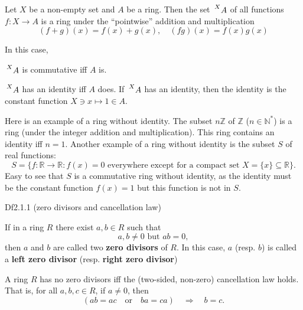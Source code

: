 \documentclass{article}
\begin{document}
\begin{Rmk_continued}{}
\begin{compactenum}
        \item \textcolor{Th}{Let $X$ be a non-empty set and $A$ be a ring. Then the set $\sideset{^X}{} {\mathop{A}}$ of all functions $f: X \to A$ is a ring under the ``pointwise'' addition and multiplication
        $$ (f + g)(x) = f(x) + g(x), \quad (fg)(x) = f(x)g(x) $$}
        \textcolor{Th}{In this case,
        \begin{compactenum}
            \item $\sideset{^X}{} {\mathop{A}}$ is commutative iff $A$ is.
            \item $\sideset{^X}{} {\mathop{A}}$ has an identity iff $A$ does. If $\sideset{^X}{} {\mathop{A}}$ has an identity, then the identity is the constant function $ X\ni x\mapsto 1 \in A $.
        \end{compactenum}}
        \item Here is an example of a ring without identity. \textcolor{Th}{The subset $n\mathbb{Z}$ of $\mathbb{Z}$ ($n\in\mathbb{N}^\ast$) is a ring (under the integer addition and multiplication). This ring contains an identity iff $n=1$.} Another example of a ring without identity is the subset $S$ of real functions:
        $$ S = \{f: \mathbb{R} \to \mathbb{R}: f(x) = 0 \text{ everywhere except for a compact set } X = \{x\} \subseteq\mathbb{R} \}. $$
        \textcolor{Th}{Easy to see that $S$ is a commutative ring without identity, as the identity must be the constant function $f(x) = 1$ but this function is not in $S$.}
    \end{compactenum}
\end{Rmk_continued}

\begin{Df}{Df2.1.1 (zero divisors and cancellation law)}
    \begin{compactenum}
        \item If in a ring $R$ there exist $a, b \in R$ such that 
        $$ a, b \neq 0 \text{ but } ab = 0, $$
        then $a$ and $b$ are called two \textbf{zero divisors} of $R$. In this case, $a$ (resp. $b$) is called a \textbf{left zero divisor} (resp. \textbf{right zero divisor}) 
        \item \textcolor{Th}{A ring $R$ has no zero divisors iff the (two-sided, non-zero) cancellation law holds. That is, for all $a, b, c \in R$, if $a\neq 0$, then
        $$ \left( ab = ac \quad\text{or}\quad ba = ca \right) \quad\Rightarrow\quad b = c. $$}
    \end{compactenum}
\end{Df}
\end{document}
